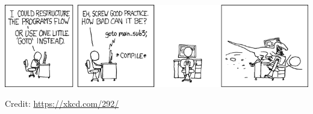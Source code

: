 \documentclass[a4paper]{article}
\begin{document}

\begin{onlysolution}
  \begin{center}
    \includegraphics[scale=5]{xkcd_292}

    \scriptsize Credit: \href{https://xkcd.com/292/}{https://xkcd.com/292/}
  \end{center}
\end{onlysolution}




\end{document}
